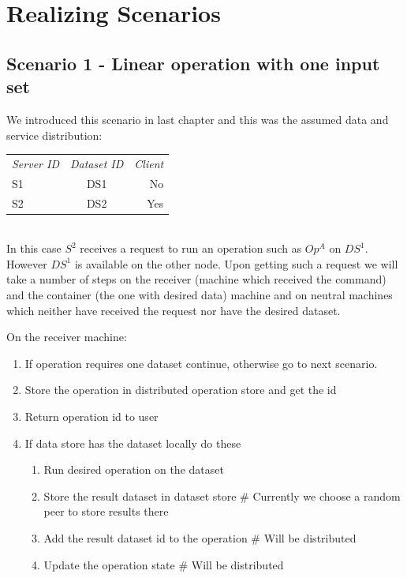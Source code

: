\section{Realizing Scenarios}
\subsection{Scenario 1 - Linear operation with one input set}
We introduced this scenario in last chapter and this was the assumed data and service distribution:

\begin{tabular}{ l c r }
\em{Server ID} & \em{ Dataset ID} & \em{ Client} \\
S1 & DS1 & No \\
S2 & DS2 & Yes \\
\end{tabular}\\

In this case \(S^2\) receives a request to run an operation such as \(Op^A\) on \(DS^1\).
However \(DS^1\) is available on the other node.
Upon getting such a request we will take a number of steps on the receiver (machine which received the command)
and the container (the one with desired data) machine and on neutral machines which neither have received the
request nor have the desired dataset.

On the receiver machine:
\begin{enumerate}
\item If operation requires one dataset continue, otherwise go to next scenario.
\item Store the operation in distributed operation store and get the id
\item Return operation id to user
\item If data store has the dataset locally do these
  \begin{enumerate}
  \item Run desired operation on the dataset
  \item Store the result dataset in dataset store \# Currently we choose a random peer to store results there
  \item Add the result dataset id to the operation \# Will be distributed
  \item Update the operation state \# Will be distributed
  \end{enumerate}
\end{enumerate}

